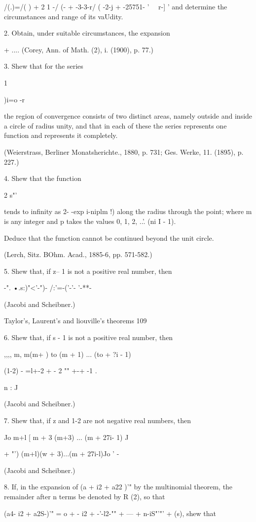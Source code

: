 {{{{/(.)=/( ) + 2 1 -/ (- + -3-3-r/ ( -2-j + -25751- ' \ \ r-] ' and
determine the circumstances and range of its vaUdity.

2. Obtain, under suitable circumstances, the expansion

+ .... (Corey, Ann. of Math. (2), i. (1900), p. 77.)

3. Shew that for the series

  1

)i=o -r~

the region of convergence consists of two distinct areas, namely
outside and inside a circle of radius unity, and that in each of these
the series represents one function and represents it completely.

(Weierstrass, Berliner Monatsherichte., 1880, p. 731; Ges. Werke, 11.
(1895), p. 227.)

4. Shew that the function

2 s"'

tends to infinity as 2- -exp i-niplm !) along the radius through the
point; where m is any integer and p takes the values 0, 1, 2, ..'.
(ni I - 1).

Deduce that the function cannot be continued beyond the unit circle.

(Lerch, Sitz. BOhm. Acad., 1885-6, pp. 571-582.)

5. Shew that, if z-- 1 is not a positive real number, then

-". •.s:)"<'-")- /:'=-('-'- '-**-

(Jacobi and Scheibner.)

Taylor's, Laurent's and liouville's theorems 109

6. Shew that, if s - 1 is not a positive real number, then

,,,, m, m(m+ ) to (m + 1) ... (to + ?i - 1)

(1-2) - =l+-2 + - 2 "" +-+ -1 .

n : J

(Jacobi and Scheibner.)

7. Shew that, if z and 1-2 are not negative real numbers, then

  Jo m+l [ m + 3 (m+3) ... (m + 27i- 1) J

+ "') (m+l)(w + 3)...(m + 27i-l)Jo ' -

(Jacobi and Scheibner.)

8. If, in the expansion of (a + i2 + a22 )'" by the multinomial
theorem, the remainder after n terms be denoted by R (2), so that

(a4- i2 + a2S-)'" = o + - i2 + -'-l2-"" + --- + n-iS"'"' + (s), shew
that

}}}}
